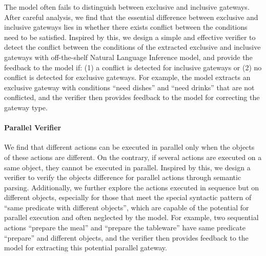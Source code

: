 The model often fails to distinguish between exclusive and inclusive gateways.
After careful analysis, we find that the essential difference between exclusive and inclusive gateways lies in whether there exists conflict between the conditions need to be satisfied.
Inspired by this, we design a simple and effective verifier to detect the conflict between the conditions of the extracted exclusive and inclusive gateways with off-the-shelf Natural Language Inference model, and provide the feedback to the model if: (1) a conflict is detected for inclusive gateways or (2) no conflict is detected for exclusive gateways.
For example, the model extracts an exclusive gateway with conditions ``need dishes'' and ``need drinks'' that are not conflicted, and the verifier then provides feedback to the model for correcting the gateway type.

\paragraph{Parallel Verifier}

We find that different actions can be executed in parallel only when the objects of these actions are different. On the contrary, if several actions are executed on a same object, they cannot be executed in parallel.
Inspired by this, we design a verifier to verify the objects difference for parallel actions through semantic parsing. Additionally, we further explore the actions executed in sequence but on different objects, especially for those that meet the special syntactic pattern of ``same predicate with different objects'', which are capable of the potential for parallel execution and often neglected by the model.
For example, two sequential actions ``prepare the meal'' and ``prepare the tableware'' have same predicate ``prepare'' and different objects, and the verifier then provides feedback to the model for extracting this potential parallel gateway.
